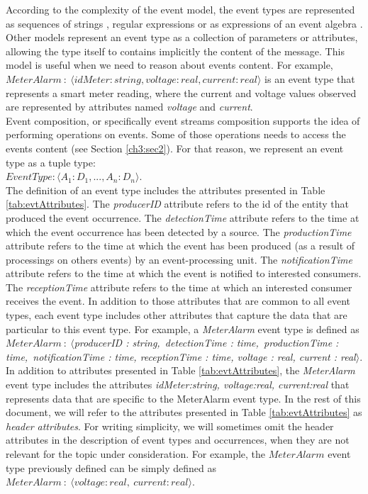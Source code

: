 According to the complexity of the event model, the event types are represented as sequences of strings \cite{Yuhara1994}, regular expressions \cite{Bailey1994} or as expressions of an event algebra \cite{Chakravarthy1994, Gatziu1994, Collet96}. Other models represent an event type as a collection of parameters or attributes, allowing the type itself to contains implicitly the content of the message. This model is useful when we need to reason about events content. For example, $MeterAlarm\ :\ \langle idMeter:string, voltage:real, current:real \rangle$ is an event type that represents a smart meter reading, where the current and voltage values observed are represented by attributes named \textit{voltage} and \textit{current}.\\
Event composition, or specifically event streams composition supports the idea of performing operations on events. Some of those operations needs to access the events content (see Section \ref{ch3:sec2}). 
For that reason, we represent an event type as a tuple type:\\
$EventType : \langle A_1 : D_1, ..., A_n : D_n\rangle.$ \\
The definition of an event type includes the attributes presented in Table \ref{tab:evtAttributes}. The \textit{producerID} attribute refers to the id of the entity that produced the event occurrence. The \textit{detectionTime} attribute refers to the time at which the event occurrence has been detected by a source. The \textit{productionTime} attribute refers to the time at which the event has been produced (as a result of processings on others events) by an event-processing unit. The \textit{notificationTime} attribute refers to the time at which the event is notified to interested consumers. The \textit{receptionTime} attribute refers to the time at which an interested consumer receives the event. In addition to those attributes that are common to all event types, each event type includes other attributes that capture the data that are particular to this event type. For example, a \textit{MeterAlarm} event type is defined as $MeterAlarm\ :\ \langle$\textit{producerID : string,\ detectionTime : time,\ productionTime : time,\ notificationTime : time, receptionTime : time, voltage : real, current : real}$\rangle$.
\\In addition to attributes presented in Table \ref{tab:evtAttributes}, the \textit{MeterAlarm} event type includes the attributes  \textit{idMeter:string, voltage:real, current:real} that represents data that are specific to the MeterAlarm event type. In the rest of this document, we will refer to the attributes presented in Table \ref{tab:evtAttributes} as \textit{header attributes}. For writing simplicity, we will sometimes omit the header attributes in the description of event types and occurrences, when they are not relevant for the topic under consideration. For example, the $MeterAlarm$ event type previously defined can be simply defined as $MeterAlarm\ :\ \langle voltage: real,\ current: real\rangle$.  

